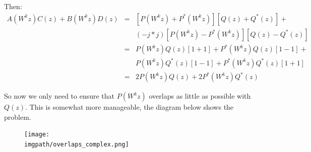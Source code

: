 Then:
\begin{eqnarray}
A(W^kz)C(z) + B(W^kz)D(z) &=&  [P(W^kz) + P^*(W^kz)][Q(z) + Q^*(z)] + \nonumber \\
  && (-j*j)[P(W^kz) - P^*(W^kz)][Q(z) - Q^*(z)] \\
&=& P(W^kz)Q(z)[1+1] + P^*(W^kz)Q(z)[1-1] + \nonumber \\ 
  && P(W^kz)Q^*(z)[1-1] + P^*(W^kz)Q^*(z)[1+1] \\
&=& 2P(W^kz)Q(z) + 2P^*(W^kz)Q^*(z)
\end{eqnarray}

So now we only need to ensure that $P(W^kz)$ overlaps as little as possible with
$Q(z)$. This is somewhat more manageable, the diagram below shows the problem.

\begin{figure}
  \texttt{[image: \\imgpath/overlaps\_complex.png]}
\end{figure}

